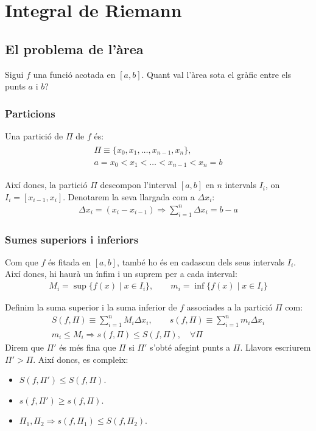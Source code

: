 \section{Integral de Riemann}
\subsection{El problema de l'àrea}
Sigui $f$ una funció acotada en $[a , b]$. Quant val l'àrea sota el gràfic entre els punts $a$ i $b$?

\subsubsection*{Particions}
Una partició de $\Pi$ de $f$ és:
\begin{align}
\begin{gathered}
    \Pi \equiv \{ x_{0} , x_{1} , \dots , x_{n-1} , x_{n} \}, \\
    a = x_{0} < x_{1} < \dots < x_{n-1} < x_{n} = b
\end{gathered}
\end{align}

Així doncs, la partició $\Pi$ descompon l'interval $[a , b]$ en $n$ intervals $I_{i}$, on $I_{i} = [x_{i-1} , x_{i}]$. Denotarem la seva llargada com a $\Delta x_{i}$:
\begin{align}
    \Delta x_{i} = (x_{i} - x_{i-1}) \Rightarrow \sum\limits_{i=1}^{n} \Delta x_{i} = b - a
\end{align}

\subsubsection*{Sumes superiors i inferiors}
Com que $f$ és fitada en $[a , b]$, també ho és en cadascun dels seus intervals $I_{i}$. Així doncs, hi haurà un ínfim i un suprem per a cada interval:
\begin{align}
    M_{i} = \sup \{ f(x) \mid x \in I_{i} \}, \qquad m_{i} = \inf \{ f(x) \mid x \in I_{i} \}
\end{align}

Definim la suma superior i la suma inferior de $f$ associades a la partició $\Pi$ com:
\begin{align}
    S(f , \Pi) \equiv \sum\limits_{i=1}^{n} M_{i} \Delta x_{i}, \qquad s(f , \Pi) \equiv \sum\limits_{i=1}^{n} m_{i} \Delta x_{i} \\
    m_{i} \leq M_{i} \Rightarrow s(f , \Pi) \leq S(f , \Pi), \quad \forall \Pi
\end{align}
Direm que $\Pi '$ és més fina que $\Pi$ si $\Pi '$ s'obté afegint punts a $\Pi$. Llavors escriurem $\Pi ' > \Pi$. Així doncs, es compleix:
\begin{itemize}
    \item $S(f , \Pi ') \leq S(f , \Pi)$.
    \item $s(f , \Pi ') \geq s(f , \Pi)$.
    \item $\Pi_{1} , \Pi_{2} \Rightarrow s(f , \Pi_{1}) \leq S(f , \Pi_{2})$.
\end{itemize}

